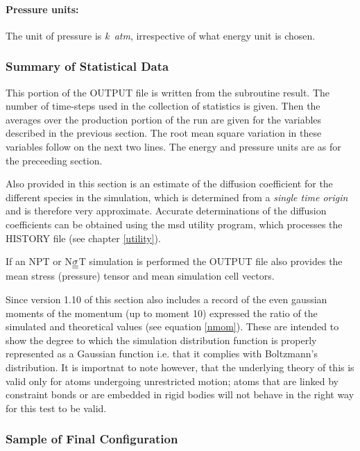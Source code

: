 \paragraph*{Pressure units:}

The unit of pressure is {\em k~atm},
irrespective of what energy unit is chosen.

\subsubsection{Summary of Statistical Data}

This portion of the OUTPUT file is written from the subroutine {\sc
result}.  The number of time-steps used in the collection of
statistics is given.  Then the averages over the production portion of
the run are given for the variables described in the previous section.
The root mean square variation in these variables follow on the next
two lines. The energy and pressure
units are as for the preceeding section.

Also provided in this section is an estimate of the diffusion
coefficient for the different species in the simulation, which is
determined from a {\em single time origin} and is therefore very
approximate. Accurate determinations of the diffusion coefficients can
be obtained using the {\sc msd} utility program, which processes the
HISTORY file (see chapter \ref{utility}).

If an NPT or N$\mbox{$\underline{\underline{\bf \sigma}}$}$T simulation is performed the OUTPUT file
also provides the mean stress (pressure) tensor and mean simulation
cell vectors.

Since version 1.10 of \D{} this section also includes a record of the
even gaussian moments of the momentum (up to moment 10) expressed the
ratio of the simulated and theoretical values (see equation
\ref{nmom}). These are intended to show the degree to which the
simulation distribution function is properly represented as a Gaussian
function i.e. that it complies with Boltzmann's distribution. It is
importnat to note however, that the underlying theory of this is valid
only for atoms undergoing unrestricted motion; atoms that are linked
by constraint bonds or are embedded in rigid bodies will not behave in
the right way for this test to be valid.

\subsubsection{Sample of Final Configuration}


